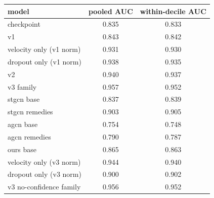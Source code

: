 \begin{tabular}{lcc}
\toprule
model & pooled AUC & within-decile AUC \\
\midrule
checkpoint & 0.835 & 0.833 \\
v1 & 0.843 & 0.842 \\
velocity only (v1 norm) & 0.931 & 0.930 \\
dropout only (v1 norm) & 0.938 & 0.935 \\
v2 & 0.940 & 0.937 \\
v3 family & 0.957 & 0.952 \\
stgcn base & 0.837 & 0.839 \\
stgcn remedies & 0.903 & 0.905 \\
agcn base & 0.754 & 0.748 \\
agcn remedies & 0.790 & 0.787 \\
ours base & 0.865 & 0.863 \\
velocity only (v3 norm) & 0.944 & 0.940 \\
dropout only (v3 norm) & 0.900 & 0.902 \\
v3 no-confidence family & 0.956 & 0.952 \\
\bottomrule
\end{tabular}
